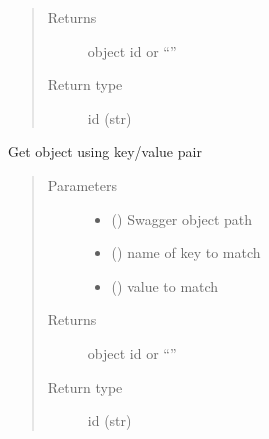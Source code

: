 \documentclass[letterpaper,10pt,english]{sphinxmanual}
\begin{document}
\begin{fulllineitems}
\begin{fulllineitems}
\begin{quote}
\begin{description}
\item[{Returns}] \leavevmode
\sphinxAtStartPar
object id or “”

\item[{Return type}] \leavevmode
\sphinxAtStartPar
id (str)

\end{description}\end{quote}

\end{fulllineitems}


\begin{fulllineitems}
\label{\detokenize{b1tdc-class:bloxone.b1tdc.get_object_by_key}}
\sphinxAtStartPar
Get object using key/value pair
\begin{quote}\begin{description}
\item[{Parameters}] \leavevmode\begin{itemize}
\item {} 
\sphinxAtStartPar
{} () \textendash{} Swagger object path

\item {} 
\sphinxAtStartPar
{} () \textendash{} name of key to match

\item {} 
\sphinxAtStartPar
{} () \textendash{} value to match

\end{itemize}

\item[{Returns}] \leavevmode
\sphinxAtStartPar
object id or “”

\item[{Return type}] \leavevmode
\sphinxAtStartPar
id (str)


\end{description}
\end{quote}
\end{fulllineitems}
\end{fulllineitems}
\end{document}
